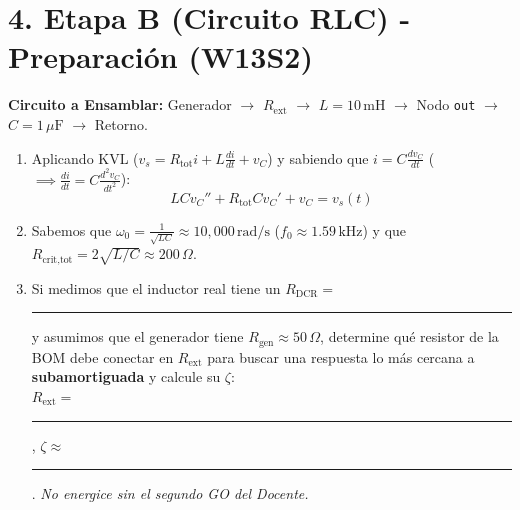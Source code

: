 \documentclass[11pt, a4paper]{article}
\begin{document}
\section*{4. Etapa B (Circuito RLC) - Preparación (W13S2)}
\noindent\textbf{Circuito a Ensamblar:} Generador $\to$ $R_{\text{ext}}$ $\to$ $L = 10\,\text{mH}$ $\to$ Nodo \texttt{out} $\to$ $C = 1\,\mu\text{F}$ $\to$ Retorno.

\begin{enumerate}\setlength\itemsep{0.25cm}
    \item Aplicando KVL ($v_s = R_{\text{tot}}i + L\frac{di}{dt} + v_C$) y sabiendo que $i = C\frac{dv_C}{dt}$ ($\implies \frac{di}{dt} = C\frac{d^2v_C}{dt^2}$):
    $$ L C v_C'' + R_{\text{tot}} C v_C' + v_C = v_s(t) $$
    \item Sabemos que $\omega_0 = \frac{1}{\sqrt{LC}} \approx 10,000\,\text{rad/s}$ ($f_0 \approx 1.59\,\text{kHz}$) y que $R_{\text{crit,tot}} = 2\sqrt{L/C} \approx 200\,\Omega$.
    \item Si medimos que el inductor real tiene un $R_{\text{DCR}} = $ \rule{1.5cm}{0.4pt} y asumimos que el generador tiene $R_{\text{gen}} \approx 50\,\Omega$, determine qué resistor de la BOM debe conectar en $R_{\text{ext}}$ para buscar una respuesta lo más cercana a \textbf{subamortiguada} y calcule su $\zeta$: \\
    $R_{\text{ext}} = $ \rule{1.5cm}{0.4pt}, $\zeta \approx $ \rule{2cm}{0.4pt}. \textit{No energice sin el segundo GO del Docente.}
\end{enumerate}
\end{document}
